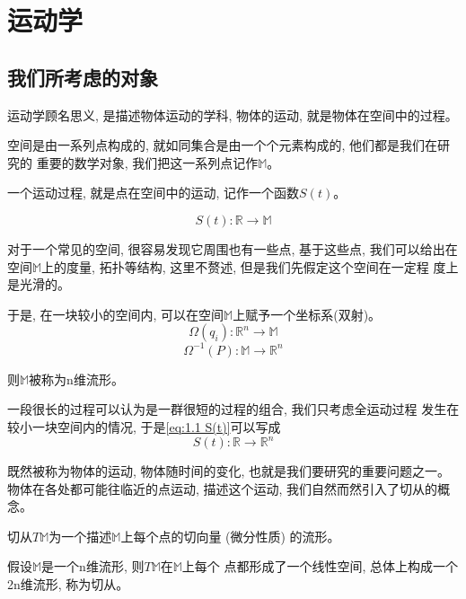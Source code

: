 \documentclass{ctexart}
\numberwithin{equation}{subsection}
\numberwithin{theorem}{subsection}
\numberwithin{definition}{subsection}
\numberwithin{proof}{subsection}
\numberwithin{lemma}{subsection}
\numberwithin{example}{subsection}
\numberwithin{remark}{subsection}
\numberwithin{corollary}{subsection}
\numberwithin{exercise}{subsection}
\numberwithin{problem}{subsection}
\numberwithin{question}{section}
\numberwithin{method}{subsection}
\begin{document}
    \section{运动学}
    \subsection{我们所考虑的对象}
    运动学顾名思义, 是描述物体运动的学科, 物体的运动, 就是物体在空间中的过程。

    空间是由一系列点构成的, 就如同集合是由一个个元素构成的, 他们都是我们在研究的
    重要的数学对象, 我们把这一系列点记作$\mathbb{M}$。

    一个运动过程, 就是点在空间中的运动, 记作一个函数$S(t)$。
    
    \begin{equation}
        \label{eq:1.1 S(t)}
        S(t):\mathbb{R} \rightarrow \mathbb{M}
    \end{equation}

    对于一个常见的空间, 很容易发现它周围也有一些点, 基于这些点, 我们可以给出在
    空间$\mathbb{M}$上的度量, 拓扑等结构, 这里不赘述, 但是我们先假定这个空间在一定程
    度上是光滑的。

    于是, 在一块较小的空间内, 可以在空间$\mathbb{M}$上赋予一个坐标系(双射)。
    \begin{equation}
        \Omega(q_i):\mathbb{R}^n \rightarrow \mathbb{M}
    \end{equation}
    \begin{equation}
        \Omega^{-1}(P):\mathbb{M} \rightarrow \mathbb{R}^n
    \end{equation}

    则$\mathbb{M}$被称为n维流形。

    一段很长的过程可以认为是一群很短的过程的组合, 我们只考虑全运动过程
    发生在较小一块空间内的情况, 于是\ref{eq:1.1 S(t)}可以写成
    \begin{equation}
        S(t):\mathbb{R} \rightarrow \mathbb{R}^n
    \end{equation}

    既然被称为物体的运动, 物体随时间的变化, 也就是我们要研究的重要问题之一。
    物体在各处都可能往临近的点运动, 描述这个运动, 我们自然而然引入了切从的概念。

    切从$T\mathbb{M}$为一个描述$\mathbb{M}$上每个点的切向量 (微分性质) 的流形。

    假设$\mathbb{M}$是一个n维流形, 则$T\mathbb{M}$在$\mathbb{M}$上每个
    点都形成了一个线性空间, 总体上构成一个2n维流形, 称为切从。
\end{document}
